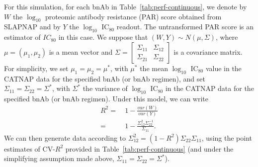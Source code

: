 \documentclass[10pt]{article}
\begin{document}
For this simulation, for each bnAb in Table~\ref{tab:perf-continuous}, we denote by $W$ the $\log_{10}$ proteomic antibody resistance (PAR) score obtained from SLAPNAP and by $Y$ the $\log_{10}$ IC$_{80}$ readout. The untransformed PAR score is an estimator of $IC_{80}$ in this case. We suppose that $(W,Y) \sim N(\mu, \Sigma)$, where $\mu = (\mu_1, \mu_2)$ is a mean vector and $\Sigma = \begin{bmatrix} \Sigma_{11} & \Sigma_{12} \\ \Sigma_{21} & \Sigma_{22} \end{bmatrix}$ is a covariance matrix. For simplicity, we set $\mu_1 = \mu_2 = \mu^*$, with $\mu^*$ the mean $\log_{10}$ IC$_{80}$ value in the CATNAP data \citep{yoon2015} for the specified bnAb (or bnAb regimen), and set $\Sigma_{11} = \Sigma_{22} = \Sigma^*$, with $\Sigma^*$ the variance of $\log_{10}$ IC$_{80}$ in the CATNAP data for the specified bnAb (or bnAb regimen). Under this model, we can write
\begin{align*}
    R^2 =& \ 1 - \frac{var(W)}{var(Y)} \\
    =& \ 1 - \frac{\Sigma_{12}^2\Sigma_{22}^{-1}}{\Sigma_{11}}.
\end{align*}
We can then generate data according to $\Sigma_{12}^2 = (1 - R^2)\Sigma_{22}\Sigma_{11}$, using the point estimates of CV-$R^2$ provided in Table~\ref{tab:perf-continuous} (and under the simplifying assumption made above, $\Sigma_{11} = \Sigma_{22} = \Sigma^*$).
\end{document}
